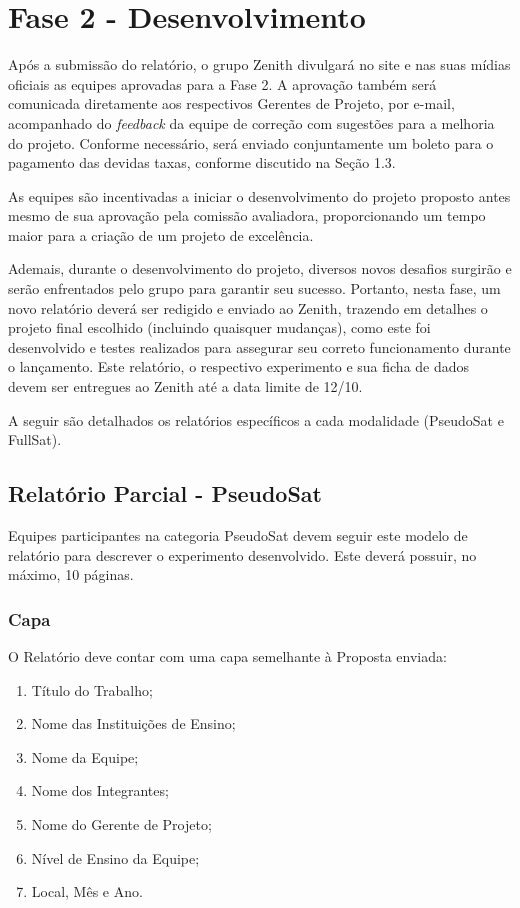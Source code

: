 \section{Fase 2 - Desenvolvimento}
    Após a submissão do relatório, o grupo Zenith divulgará no site e nas suas mídias oficiais as equipes aprovadas para a Fase 2. A aprovação também será comunicada diretamente aos respectivos Gerentes de Projeto, por e-mail, acompanhado do \textit{feedback} da equipe de correção com sugestões para a melhoria do projeto. Conforme necessário, será enviado conjuntamente um boleto para o pagamento das devidas taxas, conforme discutido na Seção 1.3.

    As equipes são incentivadas a iniciar o desenvolvimento do projeto proposto antes mesmo de sua aprovação pela comissão avaliadora, proporcionando um tempo maior para a criação de um projeto de excelência.
    
    Ademais, durante o desenvolvimento do projeto, diversos novos desafios surgirão e serão enfrentados pelo grupo para garantir seu sucesso. Portanto, nesta fase, um novo relatório deverá ser redigido e enviado ao Zenith, trazendo em detalhes o projeto final escolhido (incluindo quaisquer mudanças), como este foi desenvolvido e testes realizados para assegurar seu correto funcionamento durante o lançamento. Este relatório, o respectivo experimento e sua ficha de dados devem ser entregues ao Zenith até a data limite de 12/10.
    
    A seguir são detalhados os relatórios específicos a cada modalidade (PseudoSat e FullSat).

    \subsection{Relatório Parcial - PseudoSat}
        Equipes participantes na categoria PseudoSat devem seguir este modelo de relatório para descrever o experimento desenvolvido. Este deverá possuir, no máximo, 10 páginas.
        
        \subsubsection{Capa}
            O Relatório deve contar com uma capa semelhante à Proposta enviada:
            \begin{enumerate}
                \item Título do Trabalho; 
                \item Nome das Instituições de Ensino; 
                \item Nome da Equipe; 
                \item Nome dos Integrantes; 
                \item Nome do Gerente de Projeto;
                \item Nível de Ensino da Equipe;
                \item Local, Mês e Ano. 
            \end{enumerate}
                    
